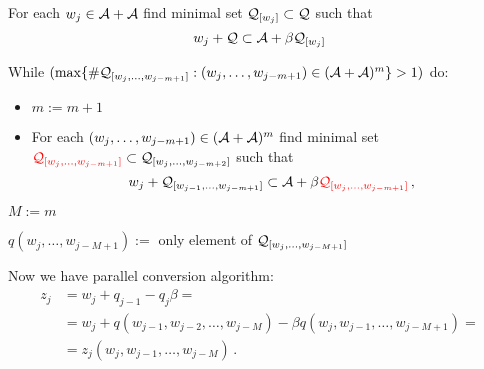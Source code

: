       For each $w_j \in \mathcal{A}+\mathcal{A}$ find minimal set $\mathcal{Q}_{[w_j]} \subset \mathcal{Q}$ such that
      $$
      w_j + \mathcal{Q} \subset \mathcal{A} + \beta \mathcal{Q}_{[w_j]}
      $$
    
      While $(\max\{\#\mathcal{Q}_{[w_j,\dots, w_{j-m+1}]}:(w_j,\dots, w_{j-m+1}) \in (\mathcal{A}+\mathcal{A})^m \} > 1)$ do:
      \begin{itemize}
          
          \item $m:= m +1$
          
          \item For each $(w_j,\dots, w_{j-m+1}) \in (\mathcal{A}+\mathcal{A})^{m}$ find minimal set $\textcolor{red}{\mathcal{Q}_{[w_j,\dots, w_{j-m+1}]}} \subset \mathcal{Q}_{[w_j,\dots, w_{j-m+2}]}$ such that
          $$
          w_j + \mathcal{Q}_{[w_{j-1},\dots, w_{j-m+1}]} \subset \mathcal{A} + \beta \textcolor{red}{\mathcal{Q}_{[w_j,\dots, w_{j-m+1}]}}\,,
          $$
      \end{itemize}
      
      $M:= m$ 
      
      
      $q(w_j,\dots, w_{j-M+1}):=$ only element of $\mathcal{Q}_{[w_j,\dots, w_{j-M+1}]}$
    



        Now we have parallel conversion algorithm:
    \begin{align*}
    z_j&=w_j + q_{j-1} - q_j \beta = \\
       &=w_j + q(w_{j-1},w_{j-2},\dots, w_{j-M}) - \beta q(w_j,w_{j-1},\dots, w_{j-M+1}) = \\
       &= z_j(w_{j},w_{j-1},\dots, w_{j-M})\,.
    \end{align*}




